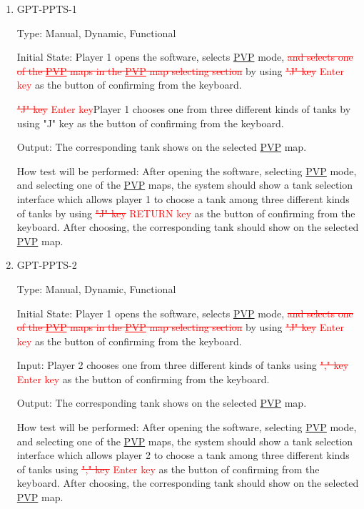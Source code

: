 \documentclass[12pt, titlepage]{article}
\begin{document}
\begin{enumerate}

\item{GPT-PPTS-1\\}

Type: Manual, Dynamic, Functional
					
Initial State: Player 1 opens the software, selects \underline{PVP} mode, \textcolor{red}{\sout{and selects one of the \underline{PVP} maps in the \underline{PVP} map selecting section}} by using \textcolor{red}{\sout{"J" key}} \textcolor{red}{Enter key} as the button of confirming from the keyboard.
					
\textcolor{red}{\sout{"J" key}} \textcolor{red}{Enter key}Player 1 chooses one from three different kinds of tanks by using "J" key as the button of confirming from the keyboard.
					
Output: The corresponding tank shows on the selected \underline{PVP} map.
					
How test will be performed: After opening the software, selecting \underline{PVP} mode, and selecting one of the \underline{PVP} maps, the system should show a tank selection interface which allows player 1 to choose a tank among three different kinds of tanks by using \textcolor{red}{\sout{"J" key}} \textcolor{red}{RETURN key} as the button of confirming from the keyboard. After choosing, the corresponding tank should show on the selected \underline{PVP} map.


\item{GPT-PPTS-2\\}

Type: Manual, Dynamic, Functional
					
Initial State: Player 1 opens the software, selects \underline{PVP} mode, \textcolor{red}{\sout{and selects one of the \underline{PVP} maps in the \underline{PVP} map selecting section}} by using \textcolor{red}{\sout{"J" key}} \textcolor{red}{Enter key} as the button of confirming from the keyboard.
					
Input: Player 2 chooses one from three different kinds of tanks using \textcolor{red}{\sout{"," key}} \textcolor{red}{Enter key} as the button of confirming from the keyboard.
					
Output: The corresponding tank shows on the selected \underline{PVP} map.
					
How test will be performed: After opening the software, selecting \underline{PVP} mode, and selecting one of the \underline{PVP} maps, the system should show a tank selection interface which allows player 2 to choose a tank among three different kinds of tanks using \textcolor{red}{\sout{"," key}} \textcolor{red}{Enter key} as the button of confirming from the keyboard. After choosing, the corresponding tank should show on the selected \underline{PVP} map.

\end{enumerate}
\end{document}
